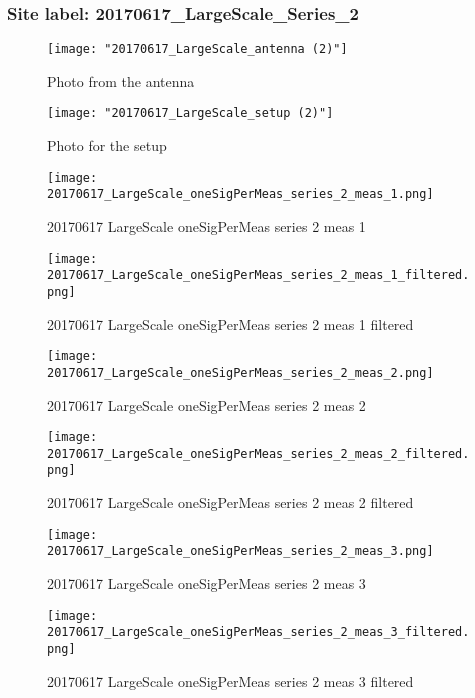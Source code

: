 \subsubsection{Site label: 20170617\_LargeScale\_Series\_2}
\begin{figure}[ht] \caption{Photo from the antenna}
\texttt{[image: "20170617\_LargeScale\_antenna (2)"]}\centering\end{figure}
\begin{figure}[ht] \caption{Photo for the setup}
\texttt{[image: "20170617\_LargeScale\_setup (2)"]}\centering\end{figure}
\begin{figure}[ht] \caption{20170617 LargeScale oneSigPerMeas series 2 meas 1}
\texttt{[image: 20170617\_LargeScale\_oneSigPerMeas\_series\_2\_meas\_1.png]}\centering\end{figure}
\begin{figure}[ht] \caption{20170617 LargeScale oneSigPerMeas series 2 meas 1 filtered}
\texttt{[image: 20170617\_LargeScale\_oneSigPerMeas\_series\_2\_meas\_1\_filtered.png]}\centering\end{figure}
\begin{figure}[ht] \caption{20170617 LargeScale oneSigPerMeas series 2 meas 2}
\texttt{[image: 20170617\_LargeScale\_oneSigPerMeas\_series\_2\_meas\_2.png]}\centering\end{figure}
\begin{figure}[ht] \caption{20170617 LargeScale oneSigPerMeas series 2 meas 2 filtered}
\texttt{[image: 20170617\_LargeScale\_oneSigPerMeas\_series\_2\_meas\_2\_filtered.png]}\centering\end{figure}
\begin{figure}[ht] \caption{20170617 LargeScale oneSigPerMeas series 2 meas 3}
\texttt{[image: 20170617\_LargeScale\_oneSigPerMeas\_series\_2\_meas\_3.png]}\centering\end{figure}
\begin{figure}[ht] \caption{20170617 LargeScale oneSigPerMeas series 2 meas 3 filtered}
\texttt{[image: 20170617\_LargeScale\_oneSigPerMeas\_series\_2\_meas\_3\_filtered.png]}\centering\end{figure}
\clearpage
